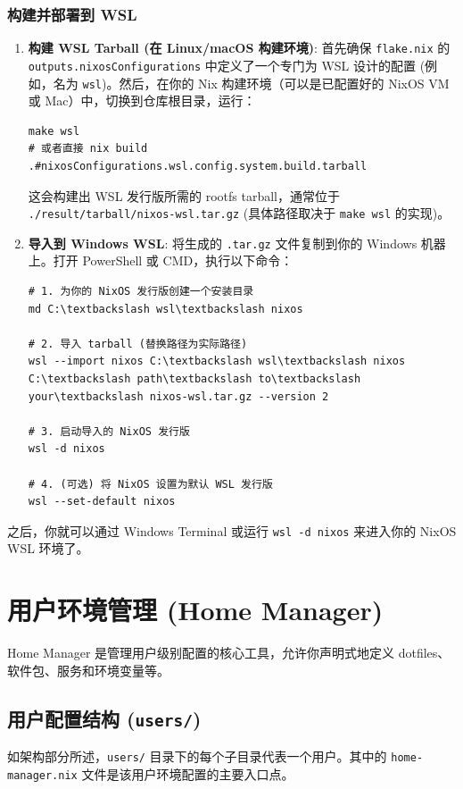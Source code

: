 \documentclass[11pt, a4paper]{article} %
\begin{document}
\subsubsection{构建并部署到 WSL}
\begin{enumerate}[label=\textbf{\arabic*.}, wide, labelwidth=!, labelindent=0pt]
    \item \textbf{构建 WSL Tarball (在 Linux/macOS 构建环境)}: 首先确保 \texttt{flake.nix} 的 \texttt{outputs.nixosConfigurations} 中定义了一个专门为 WSL 设计的配置 (例如，名为 \texttt{wsl})。然后，在你的 Nix 构建环境（可以是已配置好的 NixOS VM 或 Mac）中，切换到仓库根目录，运行：
        \begin{lstlisting}
make wsl
# 或者直接 nix build .#nixosConfigurations.wsl.config.system.build.tarball
        \end{lstlisting}
        这会构建出 WSL 发行版所需的 rootfs tarball，通常位于 \texttt{./result/tarball/nixos-wsl.tar.gz} (具体路径取决于 \texttt{make wsl} 的实现)。
    \item \textbf{导入到 Windows WSL}: 将生成的 \texttt{.tar.gz} 文件复制到你的 Windows 机器上。打开 PowerShell 或 CMD，执行以下命令：
        \begin{lstlisting}
# 1. 为你的 NixOS 发行版创建一个安装目录
md C:\textbackslash wsl\textbackslash nixos

# 2. 导入 tarball (替换路径为实际路径)
wsl --import nixos C:\textbackslash wsl\textbackslash nixos C:\textbackslash path\textbackslash to\textbackslash your\textbackslash nixos-wsl.tar.gz --version 2

# 3. 启动导入的 NixOS 发行版
wsl -d nixos

# 4. (可选) 将 NixOS 设置为默认 WSL 发行版
wsl --set-default nixos
        \end{lstlisting}
\end{enumerate}
之后，你就可以通过 Windows Terminal 或运行 \texttt{wsl -d nixos} 来进入你的 NixOS WSL 环境了。

\section{用户环境管理 (Home Manager)}
Home Manager 是管理用户级别配置的核心工具，允许你声明式地定义 dotfiles、软件包、服务和环境变量等。

\subsection{用户配置结构 (\texttt{users/})}
如架构部分所述，\texttt{users/} 目录下的每个子目录代表一个用户。其中的 \texttt{home-manager.nix} 文件是该用户环境配置的主要入口点。
\end{document}
